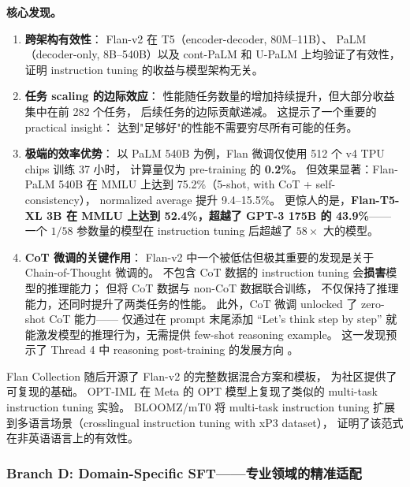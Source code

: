 \textbf{核心发现。}
\begin{enumerate}[leftmargin=1.5em]
  \item \textbf{跨架构有效性}：
    Flan-v2 在 T5（encoder-decoder, 80M--11B）、
    PaLM（decoder-only, 8B--540B）以及 cont-PaLM 和 U-PaLM 上均验证了有效性，
    证明 instruction tuning 的收益与模型架构无关。

  \item \textbf{任务 scaling 的边际效应}：
    性能随任务数量的增加持续提升，但大部分收益集中在前 282 个任务，
    后续任务的边际贡献递减。
    这提示了一个重要的 practical insight：
    达到"足够好"的性能不需要穷尽所有可能的任务。

  \item \textbf{极端的效率优势}：
    以 PaLM 540B 为例，Flan 微调仅使用 512 个 v4 TPU chips 训练 37 小时，
    计算量仅为 pre-training 的 \textbf{0.2\%}。
    但效果显著：Flan-PaLM 540B 在 MMLU 上达到 75.2\%（5-shot, with CoT + self-consistency），
    normalized average 提升 9.4--15.5\%。
    更惊人的是，\textbf{Flan-T5-XL 3B 在 MMLU 上达到 52.4\%，超越了 GPT-3 175B 的 43.9\%}——
    一个 $1/58$ 参数量的模型在 instruction tuning 后超越了 $58\times$ 大的模型。

  \item \textbf{CoT 微调的关键作用}：
    Flan-v2 中一个被低估但极其重要的发现是关于 Chain-of-Thought 微调的。
    不包含 CoT 数据的 instruction tuning 会\textbf{损害}模型的推理能力；
    但将 CoT 数据与 non-CoT 数据联合训练，
    不仅保持了推理能力，还同时提升了两类任务的性能。
    此外，CoT 微调 unlocked 了 zero-shot CoT 能力——
    仅通过在 prompt 末尾添加 ``Let's think step by step''
    就能激发模型的推理行为，无需提供 few-shot reasoning example。
    这一发现预示了 Thread 4 中 reasoning post-training 的发展方向
    。
\end{enumerate}

Flan Collection \citep{longpre2023flancollection} 随后开源了 Flan-v2 的完整数据混合方案和模板，
为社区提供了可复现的基础。
OPT-IML \citep{iyer2022optiml} 在 Meta 的 OPT 模型上复现了类似的 multi-task instruction tuning 实验。
BLOOMZ/mT0 \citep{muennighoff2022bloomz} 将 multi-task instruction tuning
扩展到多语言场景（crosslingual instruction tuning with xP3 dataset），
证明了该范式在非英语语言上的有效性。


\subsubsection{Branch D: Domain-Specific SFT——专业领域的精准适配}
\label{sec:t1-domain}


